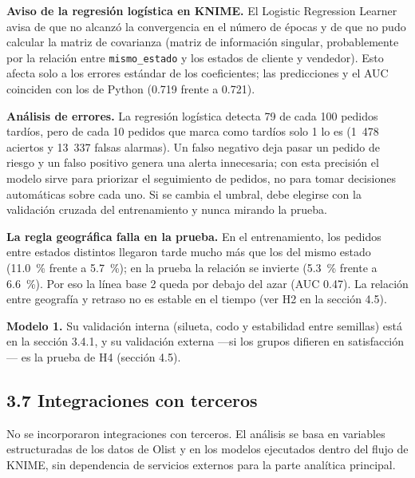 \documentclass[a4paper,stu,12pt,donotrepeattitle,floatsintext]{apa7}
\begin{document}
\textbf{Aviso de la regresión logística en KNIME.} El Logistic Regression Learner avisa de que no alcanzó la convergencia en el número de épocas y de que no pudo calcular la matriz de covarianza (matriz de información singular, probablemente por la relación entre \texttt{mismo\_\allowbreak{}estado} y los estados de cliente y vendedor). Esto afecta solo a los errores estándar de los coeficientes; las predicciones y el AUC coinciden con los de Python (0.719 frente a 0.721).

\textbf{Análisis de errores.} La regresión logística detecta 79 de cada 100 pedidos tardíos, pero de cada 10 pedidos que marca como tardíos solo 1 lo es (1~478 aciertos y 13~337 falsas alarmas). Un falso negativo deja pasar un pedido de riesgo y un falso positivo genera una alerta innecesaria; con esta precisión el modelo sirve para priorizar el seguimiento de pedidos, no para tomar decisiones automáticas sobre cada uno. Si se cambia el umbral, debe elegirse con la validación cruzada del entrenamiento y nunca mirando la prueba.

\textbf{La regla geográfica falla en la prueba.} En el entrenamiento, los pedidos entre estados distintos llegaron tarde mucho más que los del mismo estado (11.0~\% frente a 5.7~\%); en la prueba la relación se invierte (5.3~\% frente a 6.6~\%). Por eso la línea base 2 queda por debajo del azar (AUC 0.47). La relación entre geografía y retraso no es estable en el tiempo (ver H2 en la sección 4.5).

\textbf{Modelo 1.} Su validación interna (silueta, codo y estabilidad entre semillas) está en la sección 3.4.1, y su validación externa —si los grupos difieren en satisfacción— es la prueba de H4 (sección 4.5).

\subsection{3.7 Integraciones con terceros}
No se incorporaron integraciones con terceros. El análisis se basa en variables estructuradas de los datos de Olist y en los modelos ejecutados dentro del flujo de KNIME, sin dependencia de servicios externos para la parte analítica principal.
\end{document}

